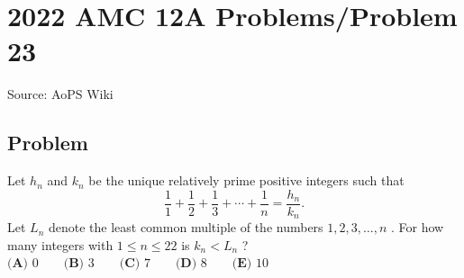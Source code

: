 \documentclass[12pt]{article}
\begin{document}
\section*{{2022 AMC 12A Problems/Problem 23}}
Source: AoPS Wiki

\subsection*{Problem}
Let $h_n$ and $k_n$ be the unique relatively prime positive integers such that \[\frac{1}{1}+\frac{1}{2}+\frac{1}{3}+\cdots+\frac{1}{n}=\frac{h_n}{k_n}.\] Let $L_n$ denote the least common multiple of the numbers $1, 2, 3, \ldots, n$ . For how many integers with $1\le{n}\le{22}$ is $k_n<L_n$ ? $\textbf{(A) }0 \qquad\textbf{(B) }3 \qquad\textbf{(C) }7 \qquad\textbf{(D) }8\qquad\textbf{(E) }10$
\end{document}
